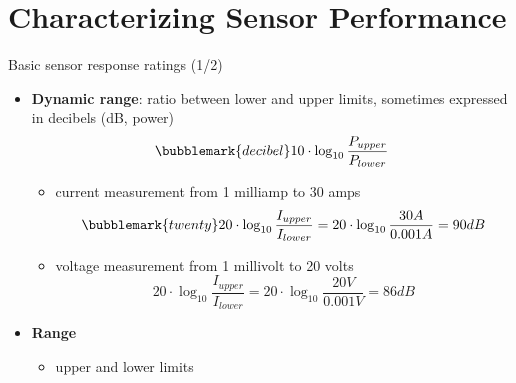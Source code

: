 \documentclass[compress]{beamer}
\begin{document}
\section[Characterizing Performance]{Characterizing Sensor Performance}\label{characterizing-sensor-performance}

\begin{frame}{Basic sensor response ratings (1/2)}

    \begin{itemize}
        \item {\bf Dynamic range}: ratio between lower and upper limits, sometimes expressed
              in decibels (dB, power)
              \[
                  \bubblemark{decibel}10\cdot \log_{10}\frac{P_{upper}}{P_{lower}}
              \]


              \begin{itemize}

                  \item<2->
                  \eg current measurement from 1 milliamp to 30 amps
                  \[
                      \bubblemark{twenty}20\cdot\log_{10}\frac{I_{upper}}{I_{lower}}=20\cdot\log_{10}\frac{30A}{0.001A}=90dB
                  \]

                  \item<3->
                  \eg voltage measurement from 1 millivolt to 20 volts
                  \[
                      20\cdot\log_{10}\frac{I_{upper}}{I_{lower}}=20\cdot\log_{10}\frac{20V}{0.001V}=86dB
                  \]
              \end{itemize}

              \item<4-> {\bf Range}
              \begin{itemize}
                  \item upper and lower limits
              \end{itemize}



    \end{itemize}

\end{frame}
\end{document}
